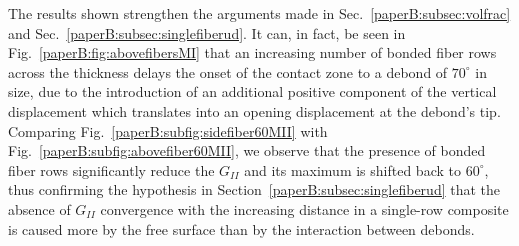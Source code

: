 The results shown strengthen the arguments made in Sec.~\ref{paperB:subsec:volfrac} and Sec.~\ref{paperB:subsec:singlefiberud}. It can, in fact, be seen in Fig.~\ref{paperB:fig:abovefibersMI} that an increasing number of bonded fiber rows across the thickness delays the onset of the contact zone to a debond of $70^{\circ}$ in size, due to the introduction of an additional positive component of the vertical displacement which translates into an opening displacement at the debond's tip.\\
Comparing Fig.~\ref{paperB:subfig:sidefiber60MII} with Fig.~\ref{paperB:subfig:abovefiber60MII}, we observe that the presence of bonded fiber rows significantly reduce the $G_{II}$ and its maximum is shifted back to $60^{\circ}$, thus confirming the hypothesis in Section~\ref{paperB:subsec:singlefiberud} that the absence of $G_{II}$ convergence with the increasing distance in a single-row composite is caused more by the free surface than by the interaction between debonds.

